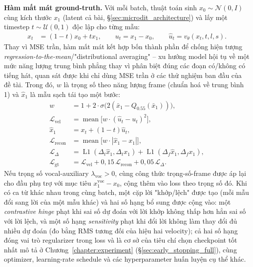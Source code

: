 \documentclass[a4paper,13pt,oneside]{report}
\begin{document}
\textbf{Hàm mất mát ground-truth.}
\label{sec:cfm_training_loss}
Với mỗi batch, thuật toán sinh $x_0\sim\mathcal{N}(0,I)$ cùng kích thước $x_1$ (latent cả
bài, \S\ref{sec:microdit_architecture}) và lấy một timestep $t\sim\mathcal{U}(0,1)$ độc lập cho
từng mẫu:
\begin{align}
 x_t&=(1-t)x_0+t x_1,\qquad u_t=x_1-x_0,\qquad \hat{u}_t=v_\theta(x_t,t,l,s).
\end{align}
Thay vì MSE trần, hàm mất mát kết hợp bốn thành phần để chống hiện tượng
\emph{regression-to-the-mean}/"distributional averaging" -- xu hướng model hội tụ về một
mức năng lượng trung bình phẳng thay vì phân biệt đúng các đoạn có/không có tiếng hát,
quan sát được khi chỉ dùng MSE trần ở các thử nghiệm ban đầu của đề tài. Trong đó, $w$ là
trọng số theo năng lượng frame (chuẩn hoá về trung bình 1) và $\hat{x}_1$ là mẫu sạch tái
tạo một bước:
\begin{align}
 w &= 1+2\cdot\sigma\!\big(2(\bar{x}_1-Q_{0.55}(\bar{x}_1))\big),\\
 \mathcal{L}_{\mathrm{vel}} &= \operatorname{mean}\!\big[w\cdot(\hat{u}_t-u_t)^2\big],\\
 \hat{x}_1 &= x_t+(1-t)\hat{u}_t,\\
 \mathcal{L}_{\mathrm{recon}} &= \operatorname{mean}\!\big[w\cdot|\hat{x}_1-x_1|\big],\\
 \mathcal{L}_{\Delta} &= \operatorname{L1}(\Delta_t\hat{x}_1,\Delta_t x_1)+\operatorname{L1}(\Delta_f\hat{x}_1,\Delta_f x_1),\\
 \mathcal{L}_{\mathrm{gt}} &= \mathcal{L}_{\mathrm{vel}}+0{,}15\,\mathcal{L}_{\mathrm{recon}}+0{,}05\,\mathcal{L}_{\Delta}.
 \label{eq:loss_gt}
\end{align}
Nếu trọng số vocal-auxiliary $\lambda_{\mathrm{voc}}>0$, cùng công thức trọng-số-frame được áp lại cho đầu phụ trợ
với mục tiêu $x_1^{\mathrm{voc}}-x_0$, cộng thêm vào loss theo trọng số đó. Khi có ca từ
khác nhau trong cùng batch, một cặp lời "khớp/lệch" được tạo (mỗi mẫu đổi sang lời của một
mẫu khác) và hai số hạng bổ sung được cộng vào: một \emph{contrastive hinge} phạt khi sai
số dự đoán với lời khớp không thấp hơn hẳn sai số với lời lệch, và một số hạng
\emph{sensitivity} phạt khi đổi lời không làm thay đổi đủ nhiều dự đoán (đo bằng RMS
tương đối của hiệu hai velocity); cả hai số hạng đóng vai trò regularizer trong loss và
là cơ sở của tiêu chí chọn checkpoint tốt nhất mô tả ở Chương~\ref{chapter:experiment}
(\S\ref{sec:early_stopping_full}), cùng optimizer, learning-rate schedule và các
hyperparameter huấn luyện cụ thể khác.
\end{document}
